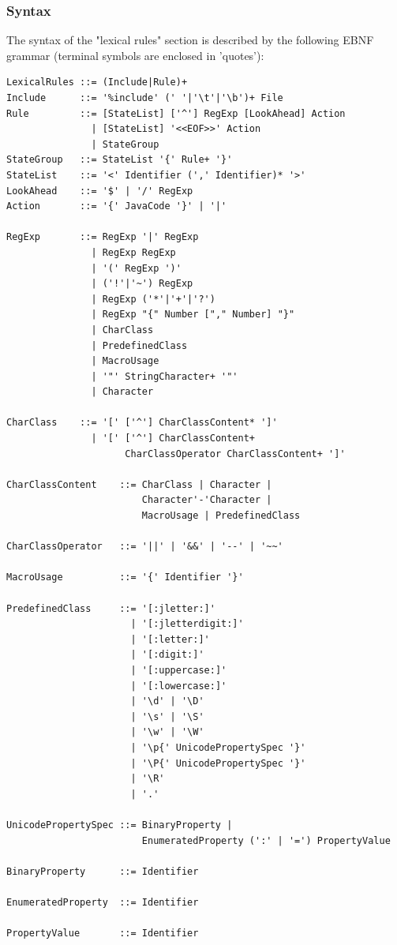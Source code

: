 \documentclass[11pt]{scrartcl}
\begin{document}
\subsubsection{Syntax}\label{Grammar}
The syntax of the "lexical rules" section is described by the following
EBNF grammar (terminal symbols are enclosed in 'quotes'):

\begin{verbatim}
LexicalRules ::= (Include|Rule)+
Include      ::= '%include' (' '|'\t'|'\b')+ File
Rule         ::= [StateList] ['^'] RegExp [LookAhead] Action 
               | [StateList] '<<EOF>>' Action
               | StateGroup 
StateGroup   ::= StateList '{' Rule+ '}' 
StateList    ::= '<' Identifier (',' Identifier)* '>' 
LookAhead    ::= '$' | '/' RegExp
Action       ::= '{' JavaCode '}' | '|'

RegExp       ::= RegExp '|' RegExp 
               | RegExp RegExp 
               | '(' RegExp ')'
               | ('!'|'~') RegExp
               | RegExp ('*'|'+'|'?')
               | RegExp "{" Number ["," Number] "}" 
               | CharClass
               | PredefinedClass 
               | MacroUsage 
               | '"' StringCharacter+ '"' 
               | Character 

CharClass    ::= '[' ['^'] CharClassContent* ']'
               | '[' ['^'] CharClassContent+ 
                     CharClassOperator CharClassContent+ ']'
                 
CharClassContent    ::= CharClass | Character |
                        Character'-'Character | 
                        MacroUsage | PredefinedClass

CharClassOperator   ::= '||' | '&&' | '--' | '~~'

MacroUsage          ::= '{' Identifier '}'

PredefinedClass     ::= '[:jletter:]' 
                      | '[:jletterdigit:]' 
                      | '[:letter:]' 
                      | '[:digit:]'
                      | '[:uppercase:]' 
                      | '[:lowercase:]'
                      | '\d' | '\D'
                      | '\s' | '\S'
                      | '\w' | '\W'
                      | '\p{' UnicodePropertySpec '}'
                      | '\P{' UnicodePropertySpec '}'
                      | '\R'
                      | '.'          
                            
UnicodePropertySpec ::= BinaryProperty | 
                        EnumeratedProperty (':' | '=') PropertyValue

BinaryProperty      ::= Identifier

EnumeratedProperty  ::= Identifier

PropertyValue       ::= Identifier
\end{verbatim}
\end{document}
